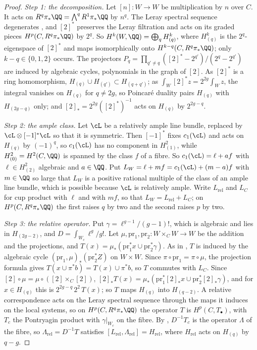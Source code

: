 \begin{proof}
\emph{Step 1: the decomposition.} Let $[n]\colon W\to W$ be multiplication
by $n$ over $C$. It acts on $R^{q}\pi_{*}\QQ=\bigwedge^{q}R^{1}\pi_{*}\QQ$ by
$n^{q}$. The Leray spectral sequence degenerates \cite[4.1.1(i)]{Del71}, and
$[2]^{*}$ preserves the Leray filtration and acts on its graded pieces
$H^{p}(C,R^{q}\pi_{*}\QQ)$ by $2^{q}$. So $H^{k}(W,\QQ)=\bigoplus_{q}
H^{k}_{(q)}$, where $H^{k}_{(q)}$ is the $2^{q}$-eigenspace of $[2]^{*}$ and
maps isomorphically onto $H^{k-q}(C,R^{q}\pi_{*}\QQ)$; only $k-q\in\{0,1,2\}$
occurs. The projectors
$P_{q}=\prod_{q'\ne q}([2]^{*}-2^{q'})/(2^{q}-2^{q'})$ are induced by
algebraic cycles, polynomials in the graph of $[2]$. As $[2]^{*}$ is a ring
homomorphism, $H_{(q)}\cup H_{(q')}\subset H_{(q+q')}$; as
$\int_{W}[2]^{*}z=2^{2g}\int_{W}z$, the integral vanishes on $H_{(q)}$ for
$q\ne2g$, so Poincar\'e duality pairs $H_{(q)}$ with $H_{(2g-q)}$ only; and
$[2]_{*}=2^{2g}([2]^{*})^{-1}$ acts on $H_{(q)}$ by $2^{2g-q}$.

\emph{Step 2: the ample class.} Let $\cL$ be a relatively ample line bundle,
replaced by $\cL\otimes[-1]^{*}\cL$ so that it is symmetric. Then $[-1]^{*}$
fixes $c_{1}(\cL)$ and acts on $H_{(q)}$ by $(-1)^{q}$, so $c_{1}(\cL)$ has no
component in $H^{2}_{(1)}$, while $H^{2}_{(0)}=H^{2}(C,\QQ)$ is spanned by the
class $f$ of a fibre. So $c_{1}(\cL)=\ell+af$ with $\ell\in H^{2}_{(2)}$
algebraic and $a\in\QQ$. Put $L_{W}=\ell+mf=c_{1}(\cL)+(m-a)f$ with
$m\in\QQ$ so large that $L_{W}$ is a positive rational multiple of the class
of an ample line bundle, which is possible because $\cL$ is relatively ample.
Write $L_{\mathrm{rel}}$ and $L_{C}$ for cup product with $\ell$ and with
$mf$, so that $L_{W}=L_{\mathrm{rel}}+L_{C}$; on
$H^{p}(C,R^{q}\pi_{*}\QQ)$ the first raises $q$ by two and the second raises
$p$ by two.

\emph{Step 3: the relative operator.} Put $\gamma=\ell^{g-1}/(g-1)!$, which is
algebraic and lies in $H_{(2g-2)}$, and $D=\int_{W_{c}}\ell^{g}/g!$. Let
$\mu,\mathrm{pr}_{1},\mathrm{pr}_{2}\colon W\times_{C}W\to W$ be the addition
and the projections, and $T(x)=\mu_{*}(\mathrm{pr}_{1}^{*}x\cup
\mathrm{pr}_{2}^{*}\gamma)$. As in , $T$ is
induced by the algebraic cycle $(\mathrm{pr}_{1},\mu)_{*}(\mathrm{pr}_{2}^{*}Z)$
on $W\times W$. Since $\pi\circ\mathrm{pr}_{1}=\pi\circ\mu$, the projection
formula gives $T(x\cup\pi^{*}b)=T(x)\cup\pi^{*}b$, so $T$ commutes with
$L_{C}$. Since $[2]\circ\mu=\mu\circ([2]\times_{C}[2])$,
$[2]_{*}T(x)=\mu_{*}(\mathrm{pr}_{1}^{*}[2]_{*}x\cup\mathrm{pr}_{2}^{*}
[2]_{*}\gamma)$, and for $x\in H_{(q)}$ this is
$2^{2g-q}\,2^{2}\,T(x)$; so $T$ maps $H_{(q)}$ into $H_{(q-2)}$. A relative
correspondence acts on the Leray spectral sequence through the maps it
induces on the local systems, so on $H^{p}(C,R^{q}\pi_{*}\QQ)$ the operator
$T$ is $H^{p}(C,T_{\bullet})$, with $T_{c}$ the Pontryagin product with
$\gamma|_{W_{c}}$ on the fibre. By , $D^{-1}T_{c}$
is the operator $\Lambda$ of the fibre, so $\Lambda_{\mathrm{rel}}=D^{-1}T$
satisfies $[L_{\mathrm{rel}},\Lambda_{\mathrm{rel}}]=H_{\mathrm{rel}}$, where
$H_{\mathrm{rel}}$ acts on $H_{(q)}$ by $q-g$.


\end{proof}
